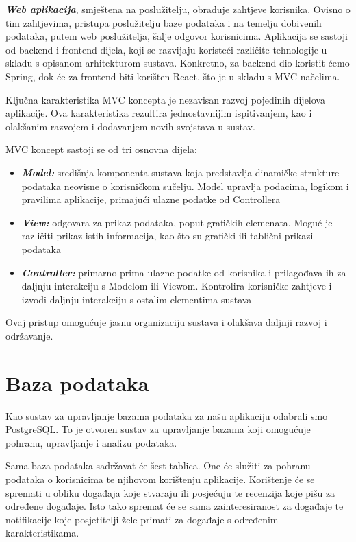	\textit{\textbf{Web aplikacija}}, smještena na poslužitelju, obrađuje zahtjeve korisnika. Ovisno o tim zahtjevima, pristupa poslužitelju baze podataka i na temelju dobivenih podataka, putem web poslužitelja, šalje odgovor korisnicima. Aplikacija se sastoji od backend i frontend dijela, koji se razvijaju koristeći različite tehnologije u skladu s opisanom arhitekturom sustava. Konkretno, za backend dio koristit ćemo Spring, dok će za frontend biti korišten React, što je u skladu s MVC načelima.
		
	Ključna karakteristika MVC koncepta je nezavisan razvoj pojedinih dijelova aplikacije. Ova karakteristika rezultira jednostavnijim ispitivanjem, kao i olakšanim razvojem i dodavanjem novih svojstava u sustav.
	
	MVC koncept sastoji se od tri osnovna dijela:
	
	\begin{itemize}
		\item 	\textit{\textbf{Model:}}	središnja komponenta sustava koja predstavlja dinamičke strukture podataka neovisne o korisničkom sučelju. Model upravlja podacima, logikom i pravilima aplikacije, primajući ulazne podatke od Controllera
		\item 	\textit{\textbf{View:}}	odgovara za prikaz podataka, poput grafičkih elemenata. Moguć je različiti prikaz istih informacija, kao što su grafički ili tablični prikazi podataka
		\item 	\textit{\textbf{Controller:}} primarno prima ulazne podatke od korisnika i prilagođava ih za daljnju interakciju s Modelom ili Viewom. Kontrolira korisničke zahtjeve i izvodi daljnju interakciju s ostalim elementima sustava
	\end{itemize}
	
	Ovaj pristup omogućuje jasnu organizaciju sustava i olakšava daljnji razvoj i održavanje.

		

				
		\section{Baza podataka}
			
			
		Kao sustav za upravljanje bazama podataka za našu aplikaciju odabrali smo PostgreSQL. To je otvoren sustav za upravljanje bazama koji omogućuje pohranu, upravljanje i analizu podataka.
			
		Sama baza podataka sadržavat će šest tablica. One će služiti za pohranu podataka o korisnicima te njihovom korištenju aplikacije. Korištenje će se spremati u obliku događaja koje stvaraju ili posjećuju te recenzija koje pišu za određene događaje. Isto tako spremat će se sama zainteresiranost za događaje te notifikacije koje posjetitelji žele primati za događaje s određenim karakteristikama.
			
